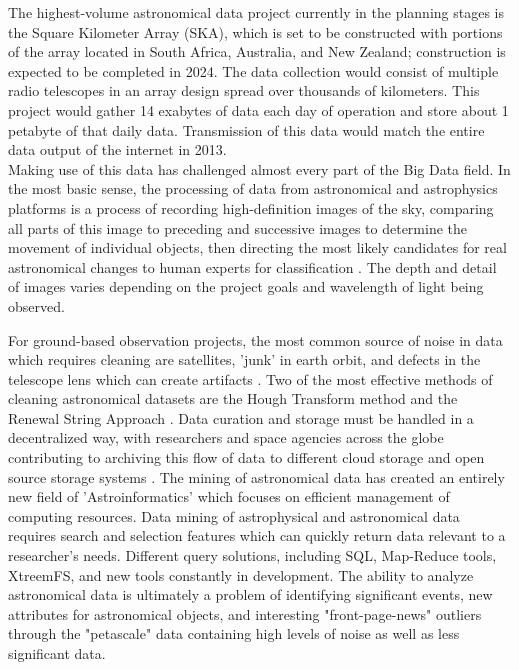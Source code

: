 \documentclass[letterpaper]{report}
\begin{document}
The highest-volume astronomical data project currently in the planning stages is the Square Kilometer Array (SKA), which is set to be constructed with portions of the array located in South Africa, Australia, and New Zealand; construction is expected to be completed in 2024. The data collection would consist of multiple radio telescopes in an array design spread over thousands of kilometers. This project would gather 14 exabytes of data each day of operation and store about 1 petabyte of\cite{Economist2010} that daily data\cite{IBM2012}. Transmission of this data would match the entire data output of the internet in 2013\cite{Andersen2012}. \\

Making use of this data has challenged almost every part of the Big Data field. In the most basic sense, the processing of data from astronomical and astrophysics platforms is a process of recording high-definition images of the sky, comparing all parts of this image to preceding and successive images to determine the movement of individual objects, then directing the most likely candidates for real astronomical changes to human experts for classification \cite{Enke2012}. The depth and detail of images varies depending on the project goals and wavelength of light being observed. 

\cite{Stephens2015}For ground-based observation projects, the most common source of noise in data which requires cleaning are satellites, 'junk' in earth orbit, and defects in the telescope lens which can create artifacts \cite{Storkey2003a}. Two of the most effective methods of cleaning astronomical datasets are the Hough Transform method and the Renewal String Approach \cite{Antolovic2008,Storkey2003} \cite{Storkey2003a}. Data curation and storage must be handled in a decentralized way, with researchers and space agencies across the globe contributing to archiving this flow of data to different cloud storage and open source storage systems \cite{Gannon2014,Stephens2008}. The mining of astronomical data has created an entirely new field of 'Astroinformatics'\cite{Borne2009} which focuses on efficient management of computing resources. Data mining of astrophysical and astronomical data requires search and selection features which can quickly return data relevant to a researcher's needs\cite{Ivezic2014,Stephens2010}. Different query solutions, including SQL, Map-Reduce tools, XtreemFS, and new tools constantly in development\cite{Enke2012,Sellam2013}. The ability to analyze astronomical data is ultimately a problem of identifying significant events, new attributes for astronomical objects, and interesting "front-page-news" outliers through the "petascale"\cite{Borne2008} data containing high levels of noise as well as less significant data.
 
\end{document}
